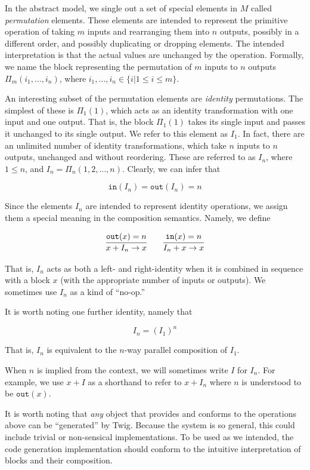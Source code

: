 In the abstract model, we single out a set of special elements in $M$ called \emph{permutation} elements. These elements are intended to represent the primitive operation of taking $m$ inputs and rearranging them into $n$ outputs, possibly in a different order, and possibly duplicating or dropping elements. The intended interpretation is that the actual values are unchanged by the operation. Formally, we name the block representing the permutation of $m$ inputs to $n$ outputs $\Pi_m(i_1,\ldots,i_n)$, where $i_1,\ldots,i_n \in \lbrace i | 1 \leq i \leq m \rbrace$.

An interesting subset of the permutation elements are \emph{identity} permutations. The simplest of these is $\Pi_1(1)$, which acts as an identity transformation with one input and one output. That is, the block $\Pi_1(1)$ takes its single input and passes it unchanged to its single output. We refer to this element as $I_1$. In fact, there are an unlimited number of identity transformations, which take $n$ inputs to $n$ outputs, unchanged and without reordering. These are referred to as $I_n$, where $1 \leq n$, and $I_n = \Pi_n(1,2,\ldots,n)$. Clearly, we can infer that

\[
\mathtt{in}(I_n) = \mathtt{out}(I_n) = n
\]

Since the elements $I_n$ are intended to represent identity operations, we assign them a special meaning in the composition semantics. Namely, we define

\[
\infer
  {x + I_n \to x}
  {\mathtt{out}(x) = n}
\qquad
\infer
  {I_n + x \to x}
  {\mathtt{in}(x) = n}
\]

That is, $I_n$ acts as both a left- and right-identity when it is combined in sequence with a block $x$ (with the appropriate number of inputs or outputs). We sometimes use $I_n$ as a kind of ``no-op.''

It is worth noting one further identity, namely that

\[
I_n = (I_1)^n
\]

That is, $I_n$ is equivalent to the $n$-way parallel composition of $I_1$.

When $n$ is implied from the context, we will sometimes write $I$ for $I_n$. For example, we use $x+I$ as a shorthand to refer to $x+I_n$ where $n$ is understood to be $\mathtt{out}(x)$.

It is worth noting that \emph{any} object that provides and conforms to the operations above can be ``generated'' by Twig. Because the system is so general, this could include trivial or non-sensical implementations. To be used as we intended, the code generation implementation should conform to the intuitive interpretation of blocks and their composition.


